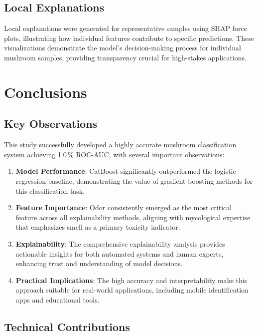 \documentclass[11pt,a4paper]{article}
\begin{document}
\subsection{Local Explanations}

Local explanations were generated for representative samples using SHAP force plots, illustrating how individual features contribute to specific predictions. These visualizations demonstrate the model's decision-making process for individual mushroom samples, providing transparency crucial for high-stakes applications.

\section{Conclusions}
\label{sec:conclusion}

\subsection{Key Observations}

This study successfully developed a highly accurate mushroom classification system achieving 1.0\,\% ROC-AUC, with several important observations:

\begin{enumerate}
    \item \textbf{Model Performance}: CatBoost significantly outperformed the logistic-regression baseline, demonstrating the value of gradient-boosting methods for this classification task.
    \item \textbf{Feature Importance}: Odor consistently emerged as the most critical feature across all explainability methods, aligning with mycological expertise that emphasizes smell as a primary toxicity indicator.
    \item \textbf{Explainability}: The comprehensive explainability analysis provides actionable insights for both automated systems and human experts, enhancing trust and understanding of model decisions.
    \item \textbf{Practical Implications}: The high accuracy and interpretability make this approach suitable for real-world applications, including mobile identification apps and educational tools.
\end{enumerate}

\subsection{Technical Contributions}
\end{document}
